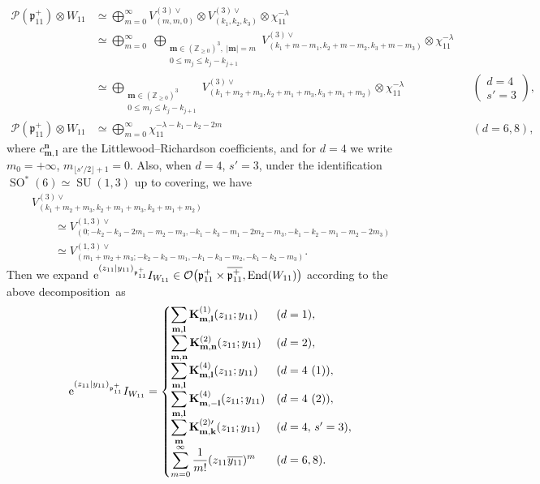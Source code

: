 \documentclass[pdftex]{sigma}
\numberwithin{equation}{section}
\newcommand{\ds}{\displaystyle}
\newcommand{\bK}{\mathbf{K}}
\newcommand{\bk}{\mathbf{k}}
\newcommand{\bl}{\mathbf{l}}
\newcommand{\bm}{\mathbf{m}}
\newcommand{\bn}{\mathbf{n}}
\newcommand{\BZ}{\mathbb{Z}}
\newcommand{\fp}{\mathfrak{p}}
\newcommand{\cO}{\mathcal{O}}
\newcommand{\cP}{\mathcal{P}}
\newcommand{\End}{\operatorname{End}}
\begin{document}
\begin{align*}
\cP(\fp^+_{11})\otimes W_{11}
&\simeq\bigoplus_{m=0}^\infty V_{(m,m,0)}^{(3)\vee}\otimes V_{(k_1,k_2,k_3)}^{(3)\vee}\otimes\chi_{11}^{-\lambda}\\
&\simeq\bigoplus_{m=0}^\infty \;\bigoplus_{\substack{\bm\in(\BZ_{\ge 0})^3,\;|\bm|=m \\ 0\le m_j\le k_j-k_{j+1}}}
V_{(k_1+m-m_1,k_2+m-m_2,k_3+m-m_3)}^{(3)\vee}\otimes\chi_{11}^{-\lambda}\\
&\simeq\bigoplus_{\substack{\bm\in(\BZ_{\ge 0})^3\\ 0\le m_j\le k_j-k_{j+1}}}
V_{(k_1+m_2+m_3,k_2+m_1+m_3,k_3+m_1+m_2)}^{(3)\vee}\otimes\chi_{11}^{-\lambda} &&\begin{pmatrix}d=4\\ s'=3\end{pmatrix},\\
\cP(\fp^+_{11})\otimes W_{11}&\simeq \bigoplus_{m=0}^\infty \chi_{11}^{-\lambda-k_1-k_2-2m} &&(d=6,8),
\end{align*}
where $c_{\bm,\bl}^\bn$ are the Littlewood--Richardson coefficients, and for $d=4$ we write $m_0=+\infty$, $m_{\lfloor s'/2\rfloor+1}=0$.
Also, when $d=4$, $s'=3$, under the identification $\operatorname{SO}^*(6)\simeq \operatorname{SU}(1,3)$ up to covering, we have
\begin{gather*}
 V_{(k_1+m_2+m_3,k_2+m_1+m_3, k_3+m_1+m_2)}^{(3)\vee} \\
 \qquad{} \simeq V_{(0;-k_2-k_3-2m_1-m_2-m_3, -k_1-k_3-m_1-2m_2-m_3, -k_1-k_2-m_1-m_2-2m_3)}^{(1,3)\vee} \\
\qquad{} \simeq V_{(m_1+m_2+m_3;-k_2-k_3-m_1, -k_1-k_3-m_2,-k_1-k_2-m_3)}^{(1,3)\vee}.
\end{gather*}
Then we expand ${\rm e}^{(z_{11}|y_{11})_{\fp^+_{11}}}I_{W_{11}} \in \cO\big(\fp^+_{11}\times\overline{\fp^+_{11}},\End(W_{11})\big)$ according to the above decomposition~as
\begin{align*}
{\rm e}^{(z_{11}|y_{11})_{\fp^+_{11}}}I_{W_{11}}=\begin{cases}
\ds \sum_{\bm,\bl}\bK^{(1)}_{\bm,\bl}(z_{11};y_{11}) & (d=1),\\
\ds \sum_{\bm,\bn}\bK^{(2)}_{\bm,\bn}(z_{11};y_{11}) & (d=2),\\
\ds \sum_{\bm,\bl}\bK^{(4)}_{\bm,\bl}(z_{11};y_{11}) & (d=4\ (1)),\\
\ds \sum_{\bm,\bl}\bK^{(4)}_{\bm,-\bl}(z_{11};y_{11}) & (d=4\ (2)),\\
\ds \sum_{\bm}\bK^{(2)\prime}_{\bm,\bk}(z_{11};y_{11}) & (d=4,\, s'=3),\\
\ds \sum_{m=0}^\infty \frac{1}{m!}(z_{11}\overline{y_{11}})^m & (d=6,8). \end{cases}
\end{align*}
\end{document}
